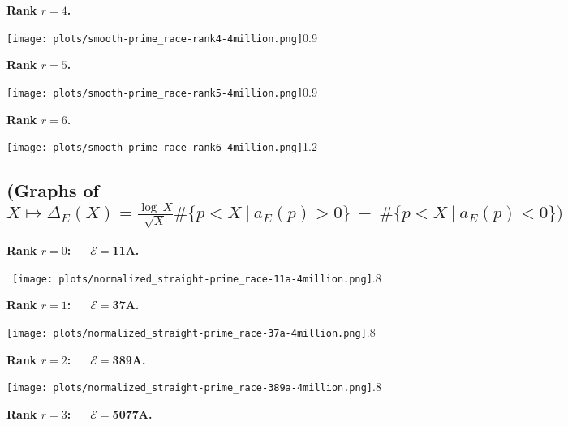 \documentclass[11pt]{article}
\theoremstyle{plain}
\theoremstyle{definition}
\numberwithin{equation}{section}
\numberwithin{figure}{section}
\numberwithin{table}{section}
\begin{document}
  \vskip30pt


  \centerline{\bf Rank $r=4$.}


  \vskip10pt



    \texttt{[image: plots/smooth-prime\_race-rank4-4million.png]}{0.9}~\label{sr4}

 \newpage


  \centerline{\bf Rank $r=5$.}


    \texttt{[image: plots/smooth-prime\_race-rank5-4million.png]}{0.9}~\label{sr5}


  \vskip30pt


  \centerline{\bf Rank $r=6$.}


 \vskip20pt



    \texttt{[image: plots/smooth-prime\_race-rank6-4million.png]}{1.2}~\label{sr6}
      \newpage
\subsection{\bf (Graphs of \ \   $X\mapsto \Delta_E(X)=  {\frac{\log\ X}{\sqrt X}}\#\{ p < X\ | \ a_E(p) > 0\}\ - \ \#\{ p < X\ | \  a_E(p) < 0\})$}  \vskip40pt


 \centerline{\bf Rank $r=0$:\ \ \  ${\mathcal E}=$11A.}~\texttt{[image: plots/normalized\_straight-prime\_race-11a-4million.png]}{.8}~\label{nr11}


\vskip40pt



  \centerline{\bf Rank $r=1$:\ \ \  ${\mathcal E}=$37A.}


 \vskip60pt



    \texttt{[image: plots/normalized\_straight-prime\_race-37a-4million.png]}{.8}~\label{nr37}
%

  \vskip40pt



  \centerline{\bf Rank $r=2$:\ \ \  ${\mathcal E}=$389A.}


  \vskip20pt



    \texttt{[image: plots/normalized\_straight-prime\_race-389a-4million.png]}{.8}~\label{nr389}


   \vskip60pt


  \centerline{\bf Rank $r=3$:\ \ \  ${\mathcal E}=$5077A.}
\end{document}
